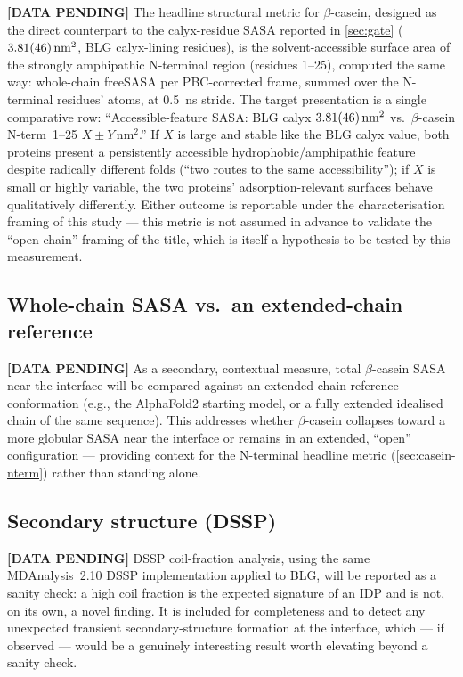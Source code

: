 \documentclass[11pt,a4paper]{article}
\begin{document}
\textbf{[DATA PENDING]} The headline structural metric for $\beta$-casein,
designed as the direct counterpart to the calyx-residue SASA reported in
\cref{sec:gate} ($\SI{3.81 \pm 0.46}{\nano\metre\squared}$, BLG calyx-lining
residues), is the solvent-accessible surface area of the strongly
amphipathic N-terminal region (residues 1--25), computed the same way:
whole-chain freeSASA per PBC-corrected frame, summed over the N-terminal
residues' atoms, at \SI{0.5}{\nano\second} stride. The target presentation
is a single comparative row: ``Accessible-feature SASA: BLG calyx
$\SI{3.81 \pm 0.46}{\nano\metre\squared}$ vs.\ $\beta$-casein N-term~1--25
$X \pm Y\,\si{\nano\metre\squared}$.'' If $X$ is large and stable like the
BLG calyx value, both proteins present a persistently accessible
hydrophobic/amphipathic feature despite radically different folds
(``two routes to the same accessibility''); if $X$ is small or highly
variable, the two proteins' adsorption-relevant surfaces behave
qualitatively differently. Either outcome is reportable under the
characterisation framing of this study --- this metric is not assumed in
advance to validate the ``open chain'' framing of the title, which is
itself a hypothesis to be tested by this measurement.

\subsection{Whole-chain SASA vs.\ an extended-chain reference}
\label{sec:casein-wholechain}

\textbf{[DATA PENDING]} As a secondary, contextual measure, total
$\beta$-casein SASA near the interface will be compared against an
extended-chain reference conformation (e.g., the AlphaFold2 starting
model, or a fully extended idealised chain of the same sequence). This
addresses whether $\beta$-casein collapses toward a more globular SASA
near the interface or remains in an extended, ``open'' configuration ---
providing context for the N-terminal headline metric
(\cref{sec:casein-nterm}) rather than standing alone.

\subsection{Secondary structure (DSSP)}
\label{sec:casein-dssp}

\textbf{[DATA PENDING]} DSSP coil-fraction analysis, using the same
MDAnalysis~2.10 DSSP implementation applied to BLG, will be reported as a
sanity check: a high coil fraction is the expected signature of an IDP
and is not, on its own, a novel finding. It is included for completeness
and to detect any unexpected transient secondary-structure formation at
the interface, which --- if observed --- would be a genuinely interesting
result worth elevating beyond a sanity check.
\end{document}
